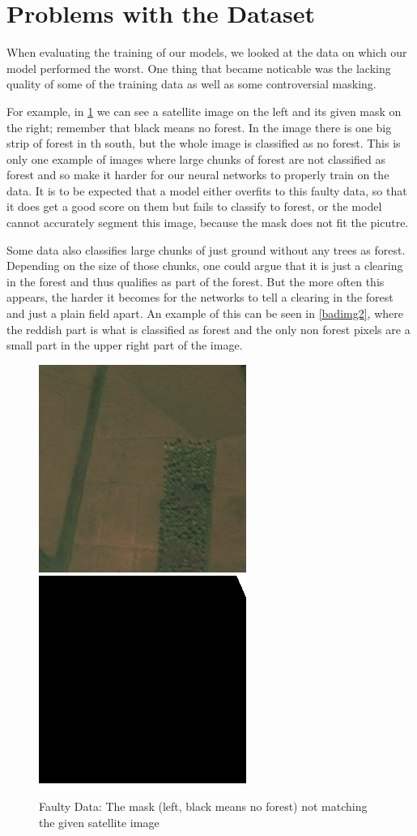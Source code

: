 \section{Problems with the Dataset}

When evaluating the training of our models, we looked at the data on which our model performed the worst. One thing that became noticable was the lacking quality of some of the training data as well as some controversial masking.

For example, in \ref{badimg} we can see a satellite image on the left and its given mask on the right; remember that black means no forest. In the image there is one big strip of forest in th south, but the whole image is classified as no forest. This is only one example of images where large chunks of forest are not classified as forest and so make it harder for our neural networks to properly train on the data. It is to be expected that a model either overfits to this faulty data, so that it does get a good score on them but fails to classify to forest, or the model cannot accurately segment this image, because the mask does not fit the picutre.

Some data also classifies large chunks of just ground without any trees as forest. Depending on the size of those chunks, one could argue that it is just a clearing in the forest and thus qualifies as part of the forest. But the more often this appears, the harder it becomes for the networks to tell a clearing in the forest and just a plain field apart. An example of this can be seen in \ref{badimg2}, where the reddish part is what is classified as forest and the only non forest pixels are a small part in the upper right part of the image.

\begin{figure}
  \begin{center}
  \label{badimg}
  \includegraphics[width=.4\linewidth]{images/satellite_images/1_imag}
  \includegraphics[width=.4\linewidth]{images/satellite_images/1_mask}
  \caption{Faulty Data: The mask (left, black means no forest) not matching the given satellite image}
  \end{center}
\end{figure}

